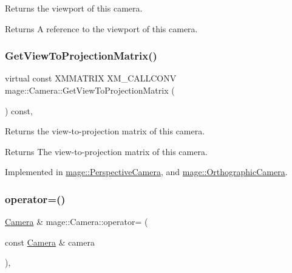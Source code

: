 Returns the viewport of this camera.

\begin{DoxyReturn}{Returns}
A reference to the viewport of this camera. 
\end{DoxyReturn}
\hypertarget{classmage_1_1_camera_a716d842481321b8b4d71da45ab77a7c9}{}\label{classmage_1_1_camera_a716d842481321b8b4d71da45ab77a7c9} 
\subsubsection{\texorpdfstring{Get\+View\+To\+Projection\+Matrix()}{GetViewToProjectionMatrix()}}
{\footnotesize\ttfamily virtual const X\+M\+M\+A\+T\+R\+IX X\+M\+\_\+\+C\+A\+L\+L\+C\+O\+NV mage\+::\+Camera\+::\+Get\+View\+To\+Projection\+Matrix (\begin{DoxyParamCaption}{ }\end{DoxyParamCaption}) const\hspace{0.3cm}{\ttfamily [pure virtual]}, {\ttfamily [noexcept]}}

Returns the view-\/to-\/projection matrix of this camera.

\begin{DoxyReturn}{Returns}
The view-\/to-\/projection matrix of this camera. 
\end{DoxyReturn}


Implemented in \hyperlink{classmage_1_1_perspective_camera_a10348ff23fab164566ffb223a75bf745}{mage\+::\+Perspective\+Camera}, and \hyperlink{classmage_1_1_orthographic_camera_a9ba51750d26d91fa094d82f875c7f1e5}{mage\+::\+Orthographic\+Camera}.

\hypertarget{classmage_1_1_camera_a785b5e3a62922f7a687ffcaecd0ef89c}{}\label{classmage_1_1_camera_a785b5e3a62922f7a687ffcaecd0ef89c} 
\subsubsection{\texorpdfstring{operator=()}{operator=()}\hspace{0.1cm}{\footnotesize\ttfamily [1/2]}}
{\footnotesize\ttfamily \hyperlink{classmage_1_1_camera}{Camera} \& mage\+::\+Camera\+::operator= (\begin{DoxyParamCaption}\item[{const \hyperlink{classmage_1_1_camera}{Camera} \&}]{camera }\end{DoxyParamCaption})\hspace{0.3cm}{\ttfamily [default]}, {\ttfamily [noexcept]}}

